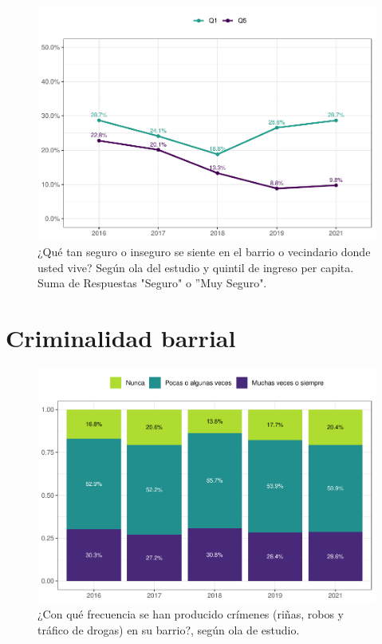 \documentclass[
  12pt,
]{book}
\begin{document}
\begin{figure}

{\centering \includegraphics{reporte-elsoc_files/figure-latex/seguri-quintil-1} 

}

\caption{¿Qué tan seguro o inseguro se siente en el barrio o vecindario donde usted vive? Según ola del estudio y quintil de ingreso per capita. Suma de Respuestas "Seguro" o ”Muy Seguro".}\label{fig:seguri-quintil}
\end{figure}

\hypertarget{criminalidad-barrial}{%
\section{Criminalidad barrial}\label{criminalidad-barrial}}

\begin{figure}

{\centering \includegraphics{reporte-elsoc_files/figure-latex/crim-olas-1} 

}

\caption{¿Con qué frecuencia se han producido crímenes (riñas, robos y tráfico de drogas) en su barrio?, según ola de estudio.}\label{fig:crim-olas}
\end{figure}
\end{document}
